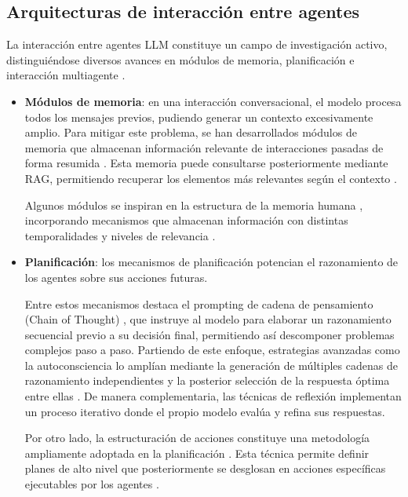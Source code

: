 \subsection{Arquitecturas de interacción entre agentes}
La interacción entre agentes LLM constituye un campo de investigación activo, distinguiéndose diversos avances en módulos de memoria, planificación e interacción multiagente \cite{wang_survey_2024}.
\begin{itemize}
  \label{sec:modulos_memoria}
  \item{\textbf{Módulos de memoria}}: en una interacción conversacional, el modelo procesa todos los mensajes previos, pudiendo generar un contexto excesivamente amplio. Para mitigar este problema, se han desarrollados módulos de memoria que almacenan información relevante de interacciones pasadas de forma resumida \cite{zhang_building_2023, fischer_reflective_2023, liang_unleashing_2023}. Esta memoria puede consultarse posteriormente mediante RAG, permitiendo recuperar los elementos más relevantes según el contexto \cite{zhao_expel_2024}.

Algunos módulos se inspiran en la estructura de la memoria humana \cite{zhong_memorybank_2024}, incorporando mecanismos que almacenan información con distintas temporalidades y niveles de relevancia \cite{wang_survey_2024, park_generative_2023}.


\item{\textbf{Planificación}}\label{plani}: los mecanismos de planificación potencian el razonamiento de los agentes sobre sus acciones futuras.

  Entre estos mecanismos destaca el prompting de cadena de pensamiento (Chain of Thought) \cite{wei_chain--thought_2023}, que instruye al modelo para elaborar un razonamiento secuencial previo a su decisión final, permitiendo así descomponer problemas complejos paso a paso.
Partiendo de este enfoque, estrategias avanzadas como la autoconsciencia \cite{liang_unleashing_2023} lo amplían mediante la generación de múltiples cadenas de razonamiento independientes y la posterior selección de la respuesta óptima entre ellas \cite{yao_tree_2023, wang_recmind_2024}. De manera complementaria, las técnicas de reflexión \cite{shinn_reflexion_2023, madaan_self-refine_2023, miao_selfcheck_2023} implementan un proceso iterativo donde el propio modelo evalúa y refina sus respuestas.

Por otro lado, la estructuración de acciones constituye una metodología ampliamente adoptada en la planificación \cite{lin_swiftsage_2023, huang_language_2022, wang_describe_2023}. Esta técnica permite definir planes de alto nivel que posteriormente se desglosan en acciones específicas ejecutables por los agentes \cite{zhu_ghost_2023, song_llm-planner_2023, wang_voyager_2023, liu_odyssey_2025}. 


\end{itemize}
